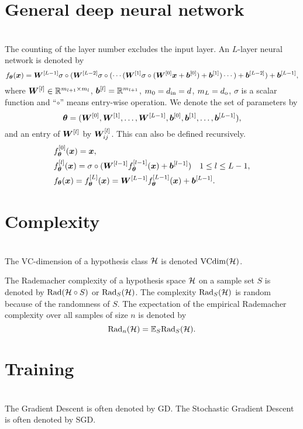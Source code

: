 \documentclass{article}
\begin{document}
\section{General deep neural network}~\\
The counting of the layer number excludes the input layer. An $L$-layer neural network is denoted by
\begin{equation}
    f_{\bm{\theta}}(\bm{x}) = \bm{W}^{[L-1]} \sigma\circ(\bm{W}^{[L-2]}\sigma\circ(\cdots (\bm{W}^{[1]} \sigma\circ(\bm{W}^{[0]} \bm{x} + \bm{b}^{[0]} ) + \bm{b}^{[1]} )\cdots)+\bm{b}^{[L-2]})+\bm{b}^{[L-1]},
\end{equation}
where $\bm{W}^{[l]} \in \mathbb{R}^{m_{l+1}\times m_{l}}$, $\bm{b}^{[l]}=\mathbb{R}^{m_{l+1}}$, $m_0=d_{\rm in}=d$, $m_{L}=d_{\rm o}$,
$\sigma$ is a scalar function and ``$\circ$'' means entry-wise operation.
We denote the set of parameters by \[
    \bm{\theta}=(\bm{W}^{[0]},\bm{W}^{[1]},\ldots,\bm{W}^{[L-1]},\bm{b}^{[0]},\bm{b}^{[1]},\ldots,\bm{b}^{[L-1]}),
\]
and  an entry of $\bm{W}^{[l]}$ by   $\bm{W}^{[l]}_{ij}$. This can also be defined recursively.
\begin{align}
     & f_{\bm{\theta}}^{[0]}(\bm{x})=\bm{x},                                                                                   \\
     & f_{\bm{\theta}}^{[l]}(\bm{x})=\sigma\circ(\bm{W}^{[l-1]} f_{\bm{\theta}}^{[l-1]}(\bm{x}) + \bm{b}^{[l-1]}) \quad 1\leq l\leq L-1, \\
     & f_{\bm{\theta}}(\bm{x})=f_{\bm{\theta}}^{[L]}(\bm{x})=\bm{W}^{[L-1]} f_{\bm{\theta}}^{[L-1]}(\bm{x}) + \bm{b}^{[L-1]}.
\end{align}

\section{Complexity}~\\
The VC-dimension of a hypothesis class $\mathcal{H}$ is denoted ${\rm VCdim}(\mathcal{H})$.

The Rademacher complexity of a hypothesis space $\mathcal{H}$ on a sample set $S$ is denoted by ${\rm Rad} (\mathcal{H}\circ S)$ or ${\rm Rad}_{S} (\mathcal{H})$. The complexity ${\rm Rad}_{S} (\mathcal{H})$ is random because of the randomness of $S$. The expectation of the empirical Rademacher complexity over all samples of size $n$ is denoted by
\[
    {\rm Rad}_{n} (\mathcal{H})=\mathbb{E}_{S} {\rm Rad}_{S} (\mathcal{H}).
\]

\section{Training}~\\
The Gradient Descent is often denoted by GD. The Stochastic Gradient Descent is often denoted by SGD.
\end{document}
